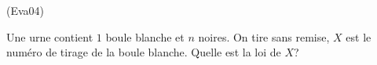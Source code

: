 \begin{tiny}(Eva04)\end{tiny} Une urne contient $1$ boule blanche et $n$ noires. On tire sans remise, $X$ est le numéro de tirage de la boule blanche. Quelle est la loi de $X$?  
